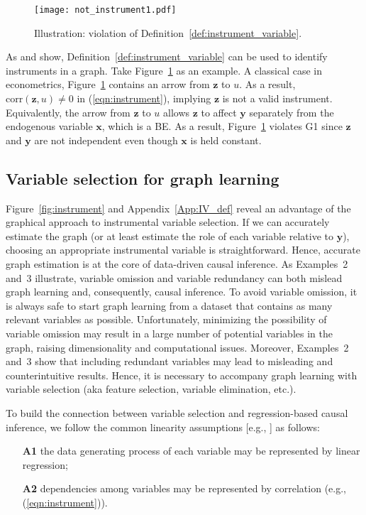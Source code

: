\documentclass[11pt,review,authoryear]{elsarticle}
\begin{document}
\begin{figure}[H]
	\centering
	\texttt{[image: not\_instrument1.pdf]}
	\caption{Illustration: violation of Definition~\ref{def:instrument_variable}.}
	\label{fig:not_instrument1}
\end{figure}

\noindent
As \citet{spirtes2000causation} and \citet{pearl2009causality} show, Definition~\ref{def:instrument_variable} can be used to identify instruments in a graph. Take Figure~\ref{fig:not_instrument1} as an example. A classical case in econometrics, Figure~\ref{fig:not_instrument1} contains an arrow from $\mathbf{z}$ to $u$. As a result, $\mathrm{corr} \left( \mathbf{z}, u \right) \neq 0$ in (\ref{eqn:instrument}), implying $\mathbf{z}$ is not a valid instrument. Equivalently, the arrow from $\mathbf{z}$ to $u$ allows $\mathbf{z}$ to affect $\mathbf{y}$ separately from the endogenous variable $\mathbf{x}$, which is a BE. As a result, Figure~\ref{fig:not_instrument1} violates G1 since $\mathbf{z}$ and $\mathbf{y}$ are not independent even though $\mathbf{x}$ is held constant.

\subsection{Variable selection for graph learning}

Figure~\ref{fig:instrument} and Appendix~\ref{App:IV_def} reveal an advantage of the graphical approach to instrumental variable selection. If we can accurately estimate the graph (or at least estimate the role of each variable relative to $\mathbf{y}$), choosing an appropriate instrumental variable is straightforward. Hence, accurate graph estimation is at the core of data-driven causal inference. As Examples~2 and~3 illustrate, variable omission and variable redundancy can both mislead graph learning and, consequently, causal inference. To avoid variable omission, it is always safe to start graph learning from a dataset that contains as many relevant variables as possible. Unfortunately, minimizing the possibility of variable omission may result in a large number of potential variables in the graph, raising dimensionality and computational issues. Moreover, Examples~2 and~3 show that including redundant variables may lead to misleading and counterintuitive results. Hence, it is necessary to accompany graph learning with variable selection (aka feature selection, variable elimination, etc.).

To build the connection between variable selection and regression-based causal inference, we follow the common linearity assumptions [e.g., \citet{bollen1989structural, geiger1994learning, spirtes2000causation}] as follows:
%
\begin{itemize}
  \item[\textbf{A1}] the data generating process of each variable may be represented by linear regression;
  \item[\textbf{A2}] dependencies among variables may be represented by correlation (e.g., (\ref{eqn:instrument})).
\end{itemize}
\end{document}

